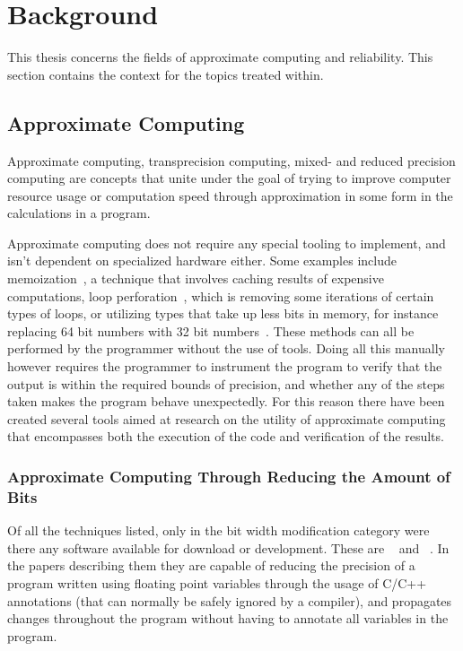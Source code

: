 \section{Background} 

This thesis concerns the fields of approximate computing and reliability. This section contains the context for the topics treated within. 

\subsection{Approximate Computing}
Approximate computing, transprecision computing, mixed- and reduced precision computing are concepts that unite under the goal of trying to improve computer resource usage or computation speed through approximation in some form in the calculations in a program. 

Approximate computing does not require any special tooling to implement, and isn't dependent on specialized hardware either. Some examples include memoization~\citep{mittal2016survey}, a technique that involves caching results of expensive computations,  loop perforation~\citep{li2018sculptor}, which is removing some iterations of certain types of loops, or utilizing types that take up less bits in memory, for instance replacing 64 bit numbers with 32 bit numbers~\citep{cherubin2019taffo, tagliavini2018flexfloat, floatsmith_paper}. These methods can all be performed by the programmer without the use of tools. Doing all this manually however requires the programmer to instrument the program to verify that the output is within the required bounds of precision, and whether any of the steps taken makes the program behave unexpectedly. For this reason there have been created several tools aimed at research on the utility of approximate computing that encompasses both the execution of the code and verification of the results. 

\subsubsection{Approximate Computing Through Reducing the Amount of Bits}
\label{section:approximate_computing_through_reducing_bits}

Of all the techniques listed, only in the bit width modification category were there any software available for download or development. These are \floatsmith{}~\citep{floatsmith_paper} and \taffo{}~\citep{cherubin2019taffo}. In the papers describing them they are capable of reducing the precision of a program written using floating point variables through the usage of C/C++ annotations (that can normally be safely ignored by a compiler), and propagates changes throughout the program without having to annotate all variables in the program.

